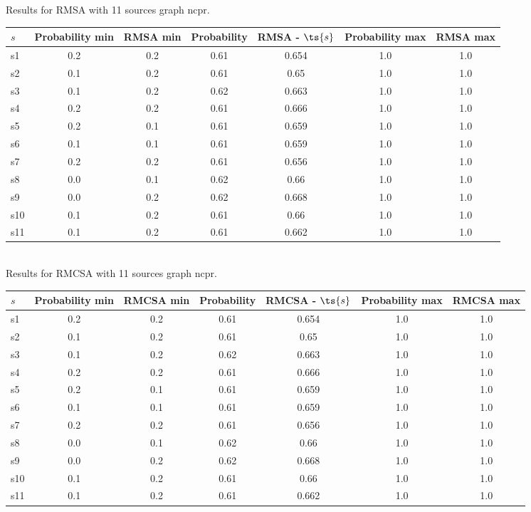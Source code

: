 \documentclass{article}
\begin{document}
\noindent Results for RMSA with 11 sources graph ncpr.

\noindent\begin{tabular}{|l|c|c|c|c|c|c|}
\hline
$s$& Probability min & RMSA min & Probability & RMSA - $\ts{s}$ & Probability max & RMSA max\\
\hline
s1 &0.2 & 0.2 & 0.61 & 0.654 & 1.0 & 1.0\\
\hline
s2 &0.1 & 0.2 & 0.61 & 0.65 & 1.0 & 1.0\\
\hline
s3 &0.1 & 0.2 & 0.62 & 0.663 & 1.0 & 1.0\\
\hline
s4 &0.2 & 0.2 & 0.61 & 0.666 & 1.0 & 1.0\\
\hline
s5 &0.2 & 0.1 & 0.61 & 0.659 & 1.0 & 1.0\\
\hline
s6 &0.1 & 0.1 & 0.61 & 0.659 & 1.0 & 1.0\\
\hline
s7 &0.2 & 0.2 & 0.61 & 0.656 & 1.0 & 1.0\\
\hline
s8 &0.0 & 0.1 & 0.62 & 0.66 & 1.0 & 1.0\\
\hline
s9 &0.0 & 0.2 & 0.62 & 0.668 & 1.0 & 1.0\\
\hline
s10 &0.1 & 0.2 & 0.61 & 0.66 & 1.0 & 1.0\\
\hline
s11 &0.1 & 0.2 & 0.61 & 0.662 & 1.0 & 1.0\\
\hline
\end{tabular}\\

\noindent Results for RMCSA with 11 sources graph ncpr.

\noindent\begin{tabular}{|l|c|c|c|c|c|c|}
\hline
$s$& Probability min & RMCSA min & Probability & RMCSA - $\ts{s}$ & Probability max & RMCSA max\\
\hline
s1 &0.2 & 0.2 & 0.61 & 0.654 & 1.0 & 1.0\\
\hline
s2 &0.1 & 0.2 & 0.61 & 0.65 & 1.0 & 1.0\\
\hline
s3 &0.1 & 0.2 & 0.62 & 0.663 & 1.0 & 1.0\\
\hline
s4 &0.2 & 0.2 & 0.61 & 0.666 & 1.0 & 1.0\\
\hline
s5 &0.2 & 0.1 & 0.61 & 0.659 & 1.0 & 1.0\\
\hline
s6 &0.1 & 0.1 & 0.61 & 0.659 & 1.0 & 1.0\\
\hline
s7 &0.2 & 0.2 & 0.61 & 0.656 & 1.0 & 1.0\\
\hline
s8 &0.0 & 0.1 & 0.62 & 0.66 & 1.0 & 1.0\\
\hline
s9 &0.0 & 0.2 & 0.62 & 0.668 & 1.0 & 1.0\\
\hline
s10 &0.1 & 0.2 & 0.61 & 0.66 & 1.0 & 1.0\\
\hline
s11 &0.1 & 0.2 & 0.61 & 0.662 & 1.0 & 1.0\\
\hline
\end{tabular}\\
\end{document}
